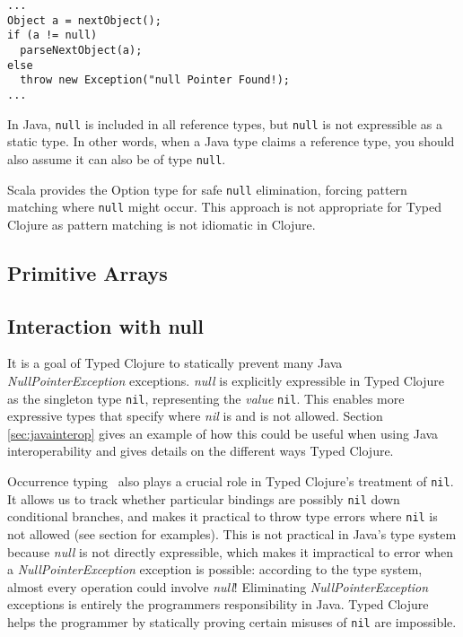 \begin{lstlisting}[caption=null elimination in Java]
...
Object a = nextObject();
if (a != null)
  parseNextObject(a);
else
  throw new Exception("null Pointer Found!);
...
\end{lstlisting}


In Java, \lstinline|null| is included in all reference
types, but \lstinline|null| is not expressible as a static type. In other words,
when a Java type claims a reference type, you should also assume it can also be of 
type \lstinline|null|.

Scala provides the Option type for safe \lstinline|null| elimination, forcing pattern matching
where \lstinline|null| might occur. This approach is not appropriate for Typed Clojure
as pattern matching is not idiomatic in Clojure.

\subsection{Primitive Arrays}


\subsection{Interaction with null}
\label{sec:interactionnull}

It is a goal of Typed Clojure to statically prevent many Java \emph{NullPointerException}
exceptions.
\emph{null} is explicitly expressible in Typed Clojure as the singleton type \lstinline|nil|,
representing the \emph{value} \lstinline|nil|.
This enables more expressive types that specify where \emph{nil} is and is not allowed.
Section \ref{sec:javainterop} gives an example of how this could be useful 
when using Java interoperability and gives details on the different ways Typed Clojure.

Occurrence typing~\cite{TF10} also plays a crucial role in Typed Clojure's
treatment of \lstinline|nil|.
It allows us to track whether particular bindings are possibly \lstinline|nil|
down conditional branches, and makes it practical to throw type errors 
where \lstinline|nil| is not allowed (see section \label{sec:OccurrenceTyping} for examples).
This is not practical in Java's type system because \emph{null} is not directly
expressible, which makes it impractical to error when a \emph{NullPointerException}
exception is possible: according to the type system, almost every operation
could involve \emph{null}!
Eliminating \emph{NullPointerException} exceptions is entirely the programmers
responsibility in Java.
Typed Clojure helps the programmer by statically proving certain misuses of \lstinline|nil| are impossible.

